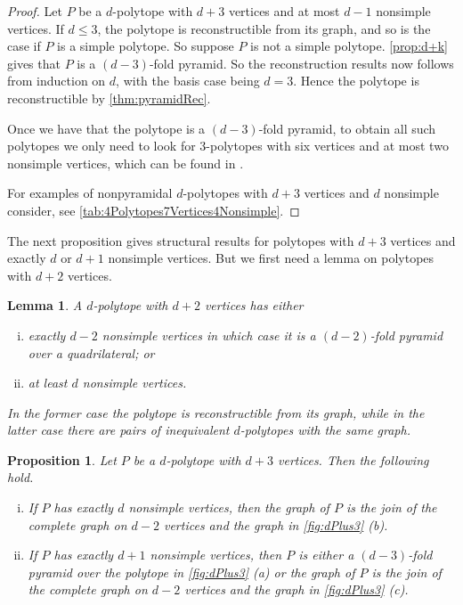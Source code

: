 \documentclass[a4paper]{amsart}
\newtheorem{lemma}[theorem]{Lemma}
\newtheorem{proposition}[theorem]{Proposition}
\theoremstyle{definition}
\theoremstyle{remark}
\begin{document}
\begin{proof}Let $P$ be a $d$-polytope with $d+3$ vertices and  at most $d-1$ nonsimple vertices. If  $d\le 3$, the polytope is reconstructible from its graph, and so is the case if $P$ is a simple polytope. So suppose $P$ is not a simple polytope. \cref{prop:d+k} gives that $P$ is a $(d-3)$-fold pyramid. So the reconstruction results now follows from induction on $d$, with the basis case being $d=3$. Hence the polytope is reconstructible by \cref{thm:pyramidRec}. 

Once we have that the polytope is a $(d-3)$-fold pyramid, to obtain all such polytopes we only need to look for 3-polytopes with six vertices and at most two nonsimple vertices, which can be found in \cite[Fig.~3]{BriDun73}.

For examples of nonpyramidal $d$-polytopes with $d+3$ vertices and $d$ nonsimple consider, see \cref{tab:4Polytopes7Vertices4Nonsimple}.
\end{proof}

The next proposition gives structural results for polytopes with $d+3$ vertices and exactly $d$ or $d+1$ nonsimple vertices. But we first need a lemma on polytopes with $d+2$ vertices.

\begin{lemma}\label{lem:dPlus2VertRec} A $d$-polytope with $d+2$ vertices has either 
\begin{enumerate}[(i)]
\item exactly $d-2$ nonsimple vertices in which case it is a $(d-2)$-fold pyramid over a quadrilateral; or
\item at least $d$ nonsimple vertices.
\end{enumerate}

In the former case the polytope is reconstructible from its graph, while in the latter case there are pairs of inequivalent $d$-polytopes with the same graph.
\end{lemma}

\begin{proposition}
\label{prop:d+3-d-d+1}  Let $P$ be a $d$-polytope with $d+3$ vertices. Then the following hold.
\begin{enumerate}[(i)]
\item If $P$ has exactly $d$ nonsimple vertices, then the graph of $P$ is the join of the complete graph on $d-2$ vertices and the graph in \cref{fig:dPlus3} (b). 

\item If $P$ has exactly $d+1$ nonsimple vertices, then $P$ is either a $(d-3)$-fold pyramid over the polytope in \cref{fig:dPlus3} (a) or the graph of $P$ is the join of the complete graph on $d-2$ vertices and the graph in \cref{fig:dPlus3} (c).
\end{enumerate}

\end{proposition}
\end{document}
